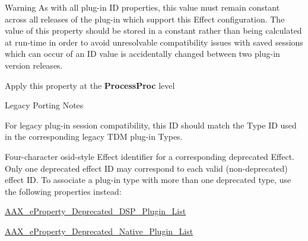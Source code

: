 \begin{Desc}
\begin{description}
\begin{DoxyWarning}{Warning}
As with all plug-\/in I\+D properties, this value must remain constant across all releases of the plug-\/in which support this Effect configuration. The value of this property should be stored in a constant rather than being calculated at run-\/time in order to avoid unresolvable compatibility issues with saved sessions which can occur of an I\+D value is accidentally changed between two plug-\/in version releases.
\end{DoxyWarning}
\begin{DoxyItemize}
\item Apply this property at the {\bfseries Process\+Proc} level\end{DoxyItemize}
\begin{DoxyRefDesc}{Legacy Porting Notes}
\item[\hyperlink{a00384__porting_notes000045}{Legacy Porting Notes}]For legacy plug-\/in session compatibility, this I\+D should match the Type I\+D used in the corresponding legacy T\+D\+M plug-\/in Types. \end{DoxyRefDesc}
\item[{\em 
\hypertarget{a00283_a6571f4e41a5dd06e4067249228e2249eadb254df9b6114516beed7a04675a22a3}{}A\+A\+X\+\_\+e\+Property\+\_\+\+Plug\+In\+I\+D\+\_\+\+Deprecated\label{a00283_a6571f4e41a5dd06e4067249228e2249eadb254df9b6114516beed7a04675a22a3}
}]Four-\/character osid-\/style Effect identifier for a corresponding deprecated Effect. Only one deprecated effect I\+D may correspond to each valid (non-\/deprecated) effect I\+D. To associate a plug-\/in type with more than one deprecated type, use the following properties instead\+:
\begin{DoxyItemize}
\item \hyperlink{a00283_a6571f4e41a5dd06e4067249228e2249eab102bc794f2770c14b1f0fe2dde6766a}{A\+A\+X\+\_\+e\+Property\+\_\+\+Deprecated\+\_\+\+D\+S\+P\+\_\+\+Plugin\+\_\+\+List}
\item \hyperlink{a00283_a6571f4e41a5dd06e4067249228e2249ea3f1e690c987d601001a7cc1da8247399}{A\+A\+X\+\_\+e\+Property\+\_\+\+Deprecated\+\_\+\+Native\+\_\+\+Plugin\+\_\+\+List}
\end{DoxyItemize}


\end{description}
\end{Desc}
